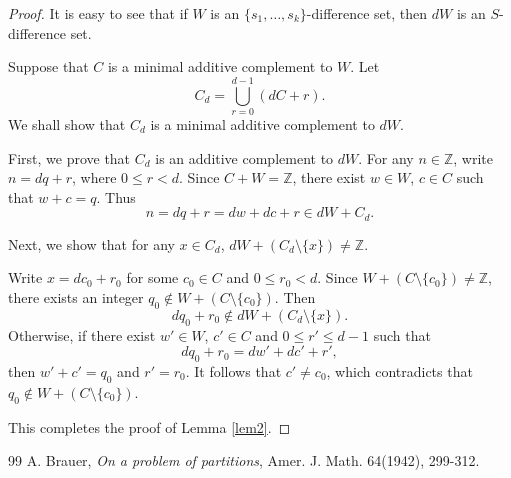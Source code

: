 \documentclass[10pt,a4paper]{amsart}
\numberwithin{equation}{section}
\begin{document}
\begin{proof} It is easy to see that if $W$ is an $\{s_1,\ldots,s_k\}$-difference set, then $d W$ is an $S$-difference set.

Suppose that $C$ is a minimal additive complement to $W$.
 Let
$$C_d=\bigcup_{r=0}^{d-1}(dC + r).$$
We shall show that $C_d$ is a minimal additive complement to $d W$.

First, we prove that $C_d$ is an additive complement to $d W$.
For any $n \in \mathbb{Z}$, write $n= dq+r$, where $0 \leq r < d$. Since
$C+W=\mathbb{Z}$, there exist $w \in W$, $c \in C$ such that $w+c=q$.
Thus
$$n=dq+r=dw+dc+r\in d W+C_d.$$

Next, we show that for any $x \in C_d$, $d W+(C_d\setminus\{x\})\neq \mathbb{Z}.$

Write $x=dc_0+r_0$ for some $c_0 \in C$ and $0 \leq r_0 < d$. Since
$W+(C\setminus\{c_0\})\neq \mathbb{Z}$, there exists an integer $q_0\notin W+(C\setminus\{c_0\})$.
Then $$dq_0+r_0\notin d W+(C_d\setminus\{x\}).$$
Otherwise, if there exist $w'\in W$, $c'\in C$ and $0\leqslant r'\leqslant d-1$ such that $$dq_0+r_0=dw'+dc'+r',$$
then $w'+c'=q_0$ and $r'=r_0.$
It follows that $c'\neq c_0$, which contradicts that $q_0\notin W+(C\setminus\{c_0\})$.

  This completes the proof of Lemma \ref{lem2}.
\end{proof}


\begin{thebibliography}{99}
 A. Brauer, {\it On a problem of partitions}, Amer. J. Math. 64(1942), 299-312.
\end{thebibliography}
\end{document}
